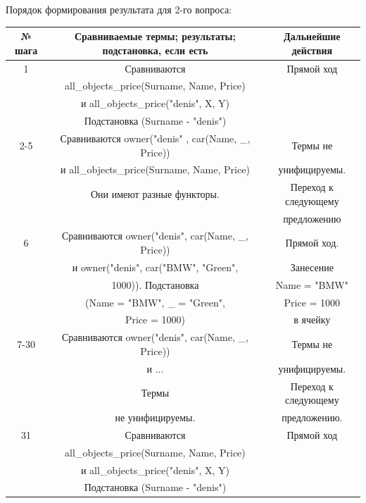 \documentclass[12pt]{report}
\begin{document}
Порядок формирования результата для 2-го вопроса:

\begin{table}[H]
	\begin{center}
		\begin{tabular}{|c c c |} 
			\hline
			№ шага & Сравниваемые термы; результаты; подстановка, если есть & Дальнейшие действия \\  
			\hline
			1 & Сравниваются & Прямой ход \\
			  & all\_objects\_price(Surname, Name, Price) & \\
			  & и all\_objects\_price("denis", X, Y)  & \\
			  & Подстановка (Surname - "denis") &\\
			\hline
			2-5 & Сравниваются owner("denis" , car(Name, _, Price)) & Термы не \\
			  & и all\_objects\_price(Surname, Name, Price) & унифицируемы. \\
			  & Они имеют разные функторы. &Переход к следующему \\
			  & & предложению\\		
			\hline
			6 & Сравниваются  owner("denis", car(Name, _, Price)) & Прямой ход. \\
			  & и owner("denis", car("BMW", "Green",  & Занесение \\
			  & 1000)). Подстановка & Name = "BMW"{} \\
			  & (Name = "BMW", \_ = "Green"{}, & Price = 1000\\
			  & Price = 1000) & в ячейку\\
			\hline
			7-30 & Сравниваются owner("denis", car(Name, _, Price)) & Термы не \\
			  & и ... & унифицируемы. \\
		      &  Термы   & Переход к следующему \\
			  & не унифицируемы. & предложению. \\
			
			\hline
			31 & Сравниваются & Прямой ход \\
			  & all\_objects\_price(Surname, Name, Price) & \\
			  & и all\_objects\_price("denis", X, Y)  & \\
			  & Подстановка (Surname - "denis") &\\
			\hline
\end{tabular}
	\end{center}
\end{table}			
\end{document}
